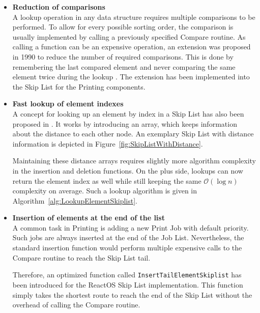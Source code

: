 \begin{itemize}
	\item \textbf{Reduction of comparisons} \\
				A lookup operation in any data structure requires multiple comparisons to be performed.
				To allow for every possible sorting order, the comparison is usually implemented by calling a previously specified Compare routine.
				As calling a function can be an expensive operation, an extension was proposed in 1990 to reduce the number of required comparisons.
				This is done by remembering the last compared element and never comparing the same element twice during the lookup \cite{pugh1990cookbook}.
				The extension has been implemented into the Skip List for the Printing components.

	\item \textbf{Fast lookup of element indexes} \\
				A concept for looking up an element by index in a Skip List has also been proposed in \cite{pugh1990cookbook}.
				It works by introducing an array, which keeps information about the distance to each other node.
				An exemplary Skip List with distance information is depicted in Figure~\ref{fig:SkipListWithDistance}.
				
				Maintaining these distance arrays requires slightly more algorithm complexity in the insertion and deletion functions.
				On the plus side, lookups can now return the element index as well while still keeping the same $\mathcal{O}(\log n)$ complexity on average.
				Such a lookup algorithm is given in Algorithm~\ref{alg:LookupElementSkiplist}.
				
	\item \textbf{Insertion of elements at the end of the list} \\
				A common task in Printing is adding a new Print Job with default priority.
				Such jobs are always inserted at the end of the Job List.
				Nevertheless, the standard insertion function would perform multiple expensive calls to the Compare routine to reach the Skip List tail.
				
				Therefore, an optimized function called \texttt{InsertTailElementSkiplist} has been introduced for the ReactOS Skip List implementation.
				This function simply takes the shortest route to reach the end of the Skip List without the overhead of calling the Compare routine.
\end{itemize}

